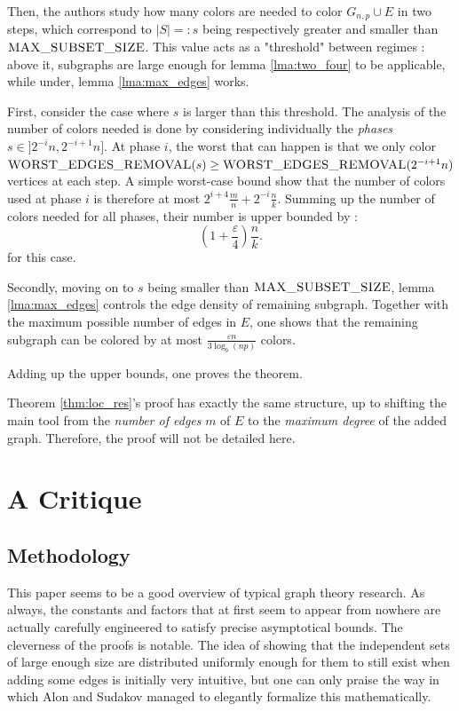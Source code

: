\documentclass[10pt,journal,a4paper]{IEEEtran}
\theoremstyle{definition}   %
\begin{document}
Then, the authors study how many colors are needed to color $G_{n, p} \cup E$ in two steps, which correspond to $|S| =: s$ being respectively greater and smaller than $\textsc{MAX\_SUBSET\_SIZE}$. This value acts as a "threshold" between regimes : above it, subgraphs are large enough for lemma \ref{lma:two_four} to be applicable, while under, lemma \ref{lma:max_edges} works.

First, consider the case where $s$ is larger than this threshold. The analysis of the number of colors needed is done by considering individually the \textit{phases} $s \in ]2^{-i}n, 2^{-i + 1}n ]$. At phase $i$, the worst that can happen is that we only color $\textsc{WORST\_EDGES\_REMOVAL}(s) \ge \textsc{WORST\_EDGES\_REMOVAL}(2^{-i + 1}n)$ vertices at each step. A simple worst-case bound show that the number of colors used at phase $i$ is therefore at most $2^{i + 4}\frac{m}{n} + 2^{-i} \frac{n}{k}$. Summing up the number of colors needed for all phases, their number is upper bounded by :
$$
(1+ \frac{\varepsilon}{4}) \frac{n}{k}.
$$ 
for this case.

Secondly, moving on to $s$ being smaller than $\textsc{MAX\_SUBSET\_SIZE}$, lemma \ref{lma:max_edges} controls the edge density of remaining subgraph. Together with the maximum possible number of edges in $E$, one shows that the remaining subgraph can be colored by at most $\frac{\varepsilon n}{3 \log_b (np)}$  colors.

Adding up the upper bounds, one proves the theorem. 

Theorem \ref{thm:loc_res}'s proof has exactly the same structure, up to shifting the main tool from the \textit{number of edges} $m$ of $E$ to the \textit{maximum degree} of the added graph. Therefore, the proof will not be detailed here.

\section{A Critique}

\subsection{Methodology}
This paper seems to be a good overview of typical graph theory research. As always, the constants and factors that at first seem to appear from nowhere are actually carefully engineered to satisfy precise asymptotical bounds. The cleverness of the proofs is notable. The idea of showing that the independent sets of large enough size are distributed uniformly enough for them to still exist when adding some edges is initially very intuitive, but one can only praise the way in which Alon and Sudakov managed to elegantly formalize this mathematically.
\end{document}
